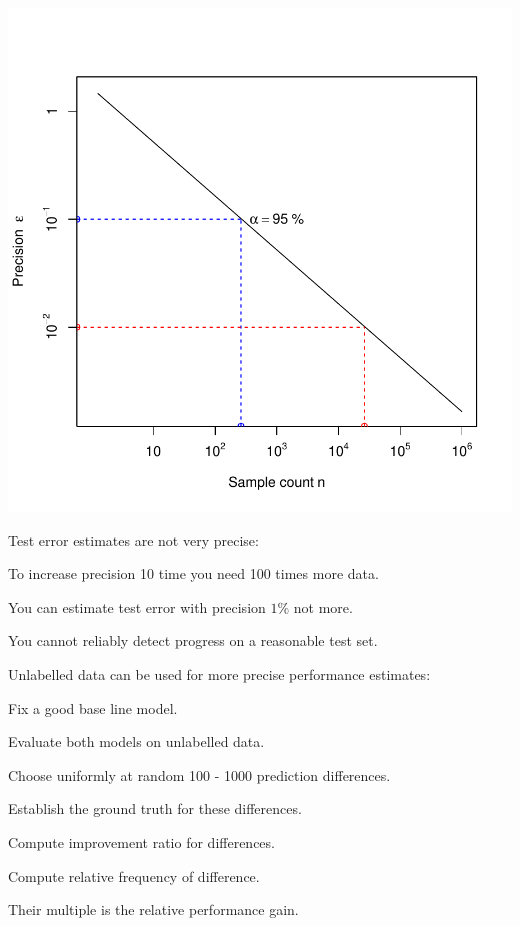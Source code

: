 \documentclass[landscape,footrule]{foils}
\begin{document}

\centerline{\includegraphics[scale=0.6, trim= 0cm 0.5cm 0cm 1cm, clip]{sampling-bounds}}

Test error estimates are not very precise: 
\begin{triangles}
\item To increase precision 10 time you need 100 times more data.
\item You can estimate test error with precision $1\%$ not more.
\item You cannot reliably detect progress on a reasonable test set.
\end{triangles}



Unlabelled data can be used for more precise performance estimates:

\begin{triangles}
\item Fix a good base line model.
\item Evaluate both models on unlabelled data.
\item Choose uniformly at random 100 - 1000 prediction differences.
\item Establish the ground truth for these differences.
\item Compute improvement ratio for differences.
\item Compute relative frequency of difference.
\item Their multiple is the relative performance gain.   
\end{triangles}  
\end{document}

